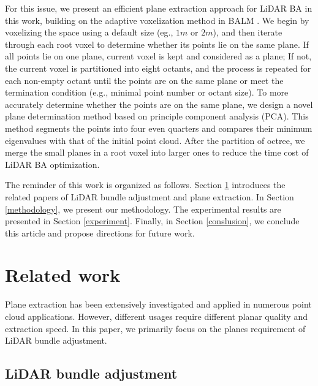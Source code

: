 \documentclass[letterpaper, 10 pt, conference]{ieeeconf}  %
\begin{document}
For this issue, we present an efficient plane extraction approach for LiDAR BA in this work, building on the adaptive voxelization method in BALM \cite{liu2021balm}. We begin by voxelizing the space using a default size (eg., $1m$ or $2m$), and then iterate through each root voxel to determine whether its points lie on the same plane. If all points lie on one plane, current voxel is kept and considered as a plane; If not, the current voxel is partitioned into eight octants, and the process is repeated for each non-empty octant until the points are on the same plane or meet the termination condition (e.g., minimal point number or octant size). To more accurately determine whether the points are on the same plane, we design a novel plane determination method based on principle component analysis (PCA). This method segments the points into four even quarters and compares their minimum eigenvalues with that of the initial point cloud. After the partition of octree, we merge the small planes in a root voxel into larger ones to reduce the time cost of LiDAR BA optimization. 

The reminder of this work is organized as follows. Section \ref{related work} introduces the related papers of LiDAR bundle adjustment and plane extraction. In Section \ref{methodology}, we present our methodology. The experimental results are presented in Section \ref{experiment}. Finally, in Section \ref{conslusion}, we conclude this article and propose directions for future work.

\section{Related work} \label{related work}

Plane extraction has been extensively investigated and applied in numerous point cloud applications. However, different usages require different planar quality and extraction speed. In this paper, we primarily focus on the planes requirement of LiDAR bundle adjustment.

\subsection{LiDAR bundle adjustment} 

\end{document}
